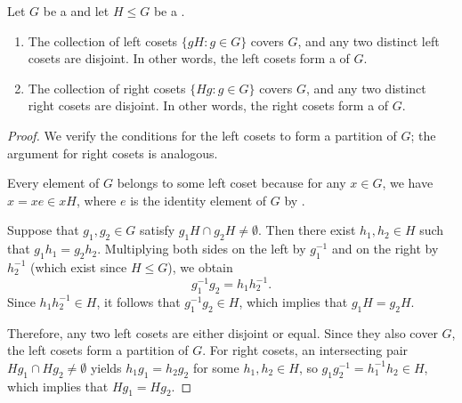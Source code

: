 \begin{lemma} \label{lemma:left_cosets_of_subgroup_partition_the_group}
Let $G$ be a  and let $H \leq G$ be a .
\begin{enumerate}
    \item The collection of left cosets $\{gH : g \in G\}$ covers $G$, and any two distinct left cosets are disjoint. In other words, the left cosets form a  of $G$.
    \item The collection of right cosets $\{Hg : g \in G\}$ covers $G$, and any two distinct right cosets are disjoint. In other words, the right cosets form a  of $G$.
\end{enumerate}
\end{lemma}
\begin{proof}
We verify the conditions for the left cosets to form a partition of $G$; the argument for right cosets is analogous.

Every element of $G$ belongs to some left coset because for any $x \in G$, we have $x = x e \in xH$, where $e$ is the identity element of $G$ by .

Suppose that $g_1, g_2 \in G$ satisfy $g_1 H \cap g_2 H \neq \emptyset$. Then there exist $h_1, h_2 \in H$ such that $g_1 h_1 = g_2 h_2$. Multiplying both sides on the left by $g_1^{-1}$ and on the right by $h_2^{-1}$ (which exist since $H \leq G$), we obtain
$$g_1^{-1} g_2 = h_1 h_2^{-1}.$$
Since $h_1 h_2^{-1} \in H$, it follows that $g_1^{-1} g_2 \in H$, which implies that $g_1 H = g_2 H$.

Therefore, any two left cosets are either disjoint or equal. Since they also cover $G$, the left cosets form a partition of $G$. For right cosets, an intersecting pair $H g_1 \cap H g_2 \neq \emptyset$ yields $h_1 g_1 = h_2 g_2$ for some $h_1, h_2 \in H$, so $g_1 g_2^{-1} = h_1^{-1} h_2 \in H$, which implies that $H g_1 = H g_2$.
\end{proof}